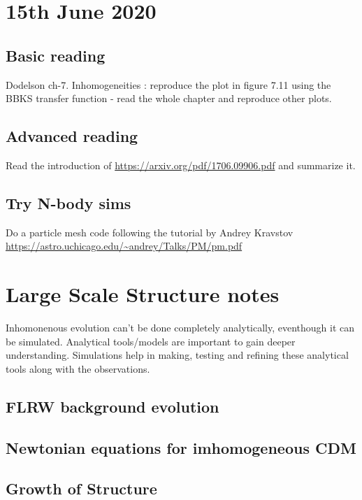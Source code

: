 \documentclass[12pt]{article}
\begin{document}
	



\section{15th June 2020}

\subsection{Basic reading}
Dodelson ch-7. Inhomogeneities : reproduce the plot in figure 7.11 using the BBKS transfer function - read the whole chapter and reproduce other plots.

\subsection{Advanced reading}
Read the introduction of \url{https://arxiv.org/pdf/1706.09906.pdf} and summarize it.

\subsection{Try N-body sims}
Do a particle mesh code following the tutorial by Andrey Kravstov \url{https://astro.uchicago.edu/~andrey/Talks/PM/pm.pdf} 

\newpage

\section{Large Scale Structure notes}

Inhomonenous evolution can't be done completely analytically, eventhough it can be simulated. Analytical tools/models are important to gain deeper understanding.  Simulations help in making, testing and refining these analytical tools along with the observations.\\

\subsection{FLRW background evolution}

\subsection{Newtonian equations for imhomogeneous CDM}

\subsection{Growth of Structure}
\end{document}
